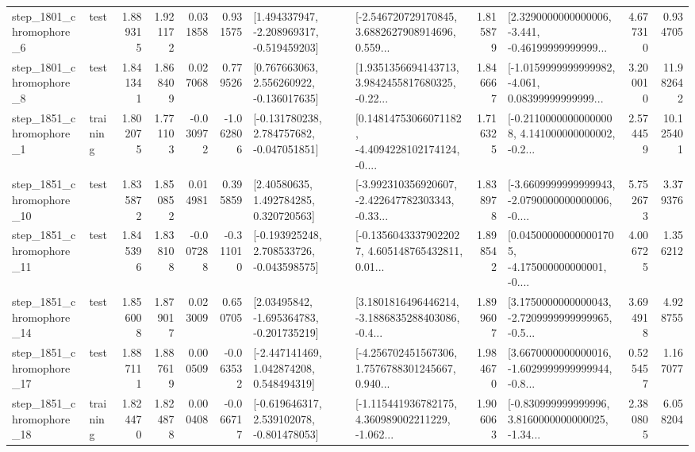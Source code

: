 \begin{tabular}{llrrrrllrlrr}
  step\_1801\_chromophore\_6 &      test &      1.889315 &    1.921172 &      0.031858 &  0.931575 &   [1.494337947, -2.208969317, -0.519459203] &  [-2.546720729170845, 3.6882627908914696, 0.559... &       1.815879 &  [2.3290000000000006, -3.441, -0.46199999999999... &            4.677310 &          0.934705 \\
  step\_1801\_chromophore\_8 &      test &      1.841341 &    1.868409 &      0.027068 &  0.779526 &    [0.767663063, 2.556260922, -0.136017635] &  [1.9351356694143713, 3.9842455817680325, -0.22... &       1.846667 &  [-1.0159999999999982, -4.061, 0.08399999999999... &            3.200010 &         11.982642 \\
  step\_1851\_chromophore\_1 &  training &      1.802075 &    1.771103 &     -0.030972 & -1.062806 &   [-0.131780238, 2.784757682, -0.047051851] &  [0.14814753066071182, -4.4094228102174124, -0.... &       1.716325 &  [-0.21100000000000008, 4.141000000000002, -0.2... &            2.574459 &         10.125401 \\
 step\_1851\_chromophore\_10 &      test &      1.835872 &    1.850852 &      0.014981 &  0.395859 &      [2.40580635, 1.492784285, 0.320720563] &  [-3.992310356920607, -2.422647782303343, -0.33... &       1.838978 &  [-3.6609999999999943, -2.0790000000000006, -0.... &            5.752673 &          3.379376 \\
 step\_1851\_chromophore\_11 &      test &      1.845396 &    1.838108 &     -0.007288 & -0.311010 &   [-0.193925248, 2.708533726, -0.043598575] &  [-0.13560433379022027, 4.605148765432811, 0.01... &       1.898542 &  [0.045000000000001705, -4.175000000000001, -0.... &            4.006725 &          1.356212 \\
 step\_1851\_chromophore\_14 &      test &      1.856008 &    1.879017 &      0.023009 &  0.650705 &    [2.03495842, -1.695364783, -0.201735219] &  [3.1801816496446214, -3.1886835288403086, -0.4... &       1.899607 &  [3.1750000000000043, -2.7209999999999965, -0.5... &            3.694918 &          4.928755 \\
 step\_1851\_chromophore\_17 &      test &      1.887111 &    1.887619 &      0.000509 & -0.063532 &    [-2.447141469, 1.042874208, 0.548494319] &  [-4.256702451567306, 1.7576788301245667, 0.940... &       1.984670 &  [3.6670000000000016, -1.6029999999999944, -0.8... &            0.525457 &          1.167077 \\
 step\_1851\_chromophore\_18 &  training &      1.824470 &    1.824878 &      0.000408 & -0.066717 &   [-0.619646317, 2.539102078, -0.801478053] &  [-1.115441936782175, 4.360989002211229, -1.062... &       1.906063 &  [-0.830999999999996, 3.8160000000000025, -1.34... &            2.380805 &          6.058204 \\

\end{tabular}
